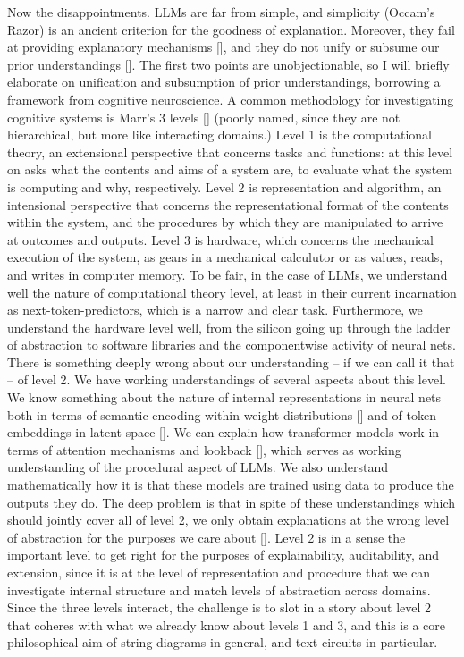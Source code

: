 Now the disappointments. LLMs are far from simple, and simplicity (Occam's Razor) is an ancient criterion for the goodness of explanation. Moreover, they fail at providing explanatory mechanisms [], and they do not unify or subsume our prior understandings []. The first two points are unobjectionable, so I will briefly elaborate on unification and subsumption of prior understandings, borrowing a framework from cognitive neuroscience. A common methodology for investigating cognitive systems is Marr's 3 levels [] (poorly named, since they are not hierarchical, but more like interacting domains.) Level 1 is the computational theory, an extensional perspective that concerns tasks and functions: at this level on asks what the contents and aims of a system are, to evaluate what the system is computing and why, respectively. Level 2 is representation and algorithm, an intensional perspective that concerns the representational format of the contents within the system, and the procedures by which they are manipulated to arrive at outcomes and outputs. Level 3 is hardware, which concerns the mechanical execution of the system, as gears in a mechanical calculutor or as values, reads, and writes in computer memory. To be fair, in the case of LLMs, we understand well the nature of computational theory level, at least in their current incarnation as next-token-predictors, which is a narrow and clear task. Furthermore, we understand the hardware level well, from the silicon going up through the ladder of abstraction to software libraries and the componentwise activity of neural nets. There is something deeply wrong about our understanding -- if we can call it that -- of level 2. We have working understandings of several aspects about this level. We know something about the nature of internal representations in neural nets both in terms of semantic encoding within weight distributions [] and of token-embeddings in latent space []. We can explain how transformer models work in terms of attention mechanisms and lookback [], which serves as working understanding of the procedural aspect of LLMs. We also understand mathematically how it is that these models are trained using data to produce the outputs they do. The deep problem is that in spite of these understandings which should jointly cover all of level 2, we only obtain explanations at the wrong level of abstraction for the purposes we care about []. Level 2 is in a sense the important level to get right for the purposes of explainability, auditability, and extension, since it is at the level of representation and procedure that we can investigate internal structure and match levels of abstraction across domains. Since the three levels interact, the challenge is to slot in a story about level 2 that coheres with what we already know about levels 1 and 3, and this is a core philosophical aim of string diagrams in general, and text circuits in particular.

